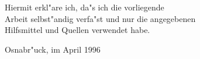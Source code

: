 \thispagestyle{empty}
\vspace*{6cm}
\begin{center}

Hiermit erkl"are ich, da"s ich die vorliegende
\\
Arbeit selbst"andig verfa"st und nur die angegebenen
\\
Hilfsmittel und Quellen verwendet habe.

\vspace*{4cm}
Osnabr"uck, im April 1996

\end{center}

